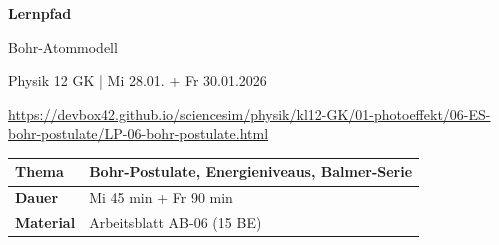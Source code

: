 \documentclass[a4paper,11pt]{article}
\begin{document}
\begin{center}
\vspace*{2cm}

{\Huge\bfseries\color{physik} Lernpfad}

\vspace{0.5cm}

{\Large Bohr-Atommodell}

\vspace{0.3cm}

{\normalsize Physik 12 GK | Mi 28.01. + Fr 30.01.2026}

\vspace{2cm}


\vspace{1.5cm}

{\small\color{gray}
\url{https://devbox42.github.io/sciencesim/physik/kl12-GK/01-photoeffekt/06-ES-bohr-postulate/LP-06-bohr-postulate.html}
}

\vspace{2cm}

\begin{tabular}{|l|l|}
\hline
\textbf{Thema} & Bohr-Postulate, Energieniveaus, Balmer-Serie \\
\hline
\textbf{Dauer} & Mi 45 min + Fr 90 min \\
\hline
\textbf{Material} & Arbeitsblatt AB-06 (15 BE) \\
\hline
\end{tabular}

\end{center}
\end{document}
